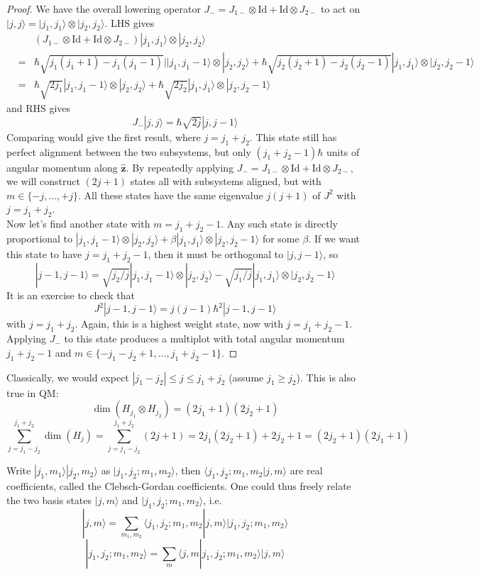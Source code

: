 \documentclass[a4paper]{article}
\begin{document}
\begin{proof}
We have the overall lowering operator $J_-=J_{1-}\otimes\text{Id}+\text{Id}\otimes J_{2-}$ to act on $|j,j\rangle=|j_1,j_1\rangle\otimes|j_2,j_2\rangle$. LHS gives
\begin{eqnarray}
& &(J_{1-}\otimes\text{Id}+\text{Id}\otimes J_{2-})|j_1,j_1\rangle\otimes|j_2,j_2\rangle\nonumber\\&=&\hbar\sqrt{j_1(j_1+1)-j_1(j_1-1)}||j_1,j_1-1\rangle\otimes|j_2,j_2\rangle+\hbar\sqrt{j_2(j_2+1)-j_2(j_2-1)}|j_1,j_1\rangle\otimes|j_2,j_2-1\rangle\nonumber\\&=&\hbar\sqrt{2j_1}|j_1,j_1-1\rangle\otimes|j_2,j_2\rangle+\hbar\sqrt{2j_2}|j_1,j_1\rangle\otimes|j_2,j_2-1\rangle\nonumber
\end{eqnarray}
and RHS gives
$$J_-|j,j\rangle=\hbar\sqrt{2j}|j,j-1\rangle$$
Comparing would give the first result, where $j=j_1+j_2$. This state still has perfect alignment between the two subsystems, but only $(j_1+j_2-1)\hbar$ units of angular momentum along $\mathbf{\hat{z}}$. By repeatedly applying $J_-=J_{1-}\otimes\text{Id}+\text{Id}\otimes J_{2-}$, we will construct $(2j+1)$ states all with subsystems aligned, but with $m\in\{-j,...,+j\}$. All these states have the same eigenvalue $j(j+1)$ of $J^2$ with $j=j_1+j_2$.\\[5pt]
Now let's find another state with $m=j_1+j_2-1$. Any such state is directly proportional to $|j_1,j_1-1\rangle\otimes|j_2,j_2\rangle+\beta|j_1,j_1\rangle\otimes|j_2,j_2-1\rangle$ for some $\beta$. If we want this state to have $j=j_1+j_2-1$, then it must be orthogonal to $|j,j-1\rangle$, so
$$|j-1,j-1\rangle=\sqrt{j_2/j}|j_1,j_1-1\rangle\otimes|j_2,j_2\rangle-\sqrt{j_1/j}|j_1,j_1\rangle\otimes|j_2,j_2-1\rangle$$
It is an exercise to check that
$$J^2|j-1,j-1\rangle=j(j-1)\hbar^2|j-1,j-1\rangle$$
with $j=j_1+j_2$. Again, this is a highest weight state, now with $j = j_1 + j_2 − 1$. Applying $J_-$ to this state produces a multiplot with total angular momentum $j_1+j_2-1$ and $m\in\{-j_1-j_2+1,...,j_1+j_2-1\}$.
\end{proof}
\begin{remarks}
Classically, we would expect $|j_1-j_2|\leq j\leq j_1+j_2$ (assume $j_1\geq j_2$). This is also true in QM: 
$$\dim(H_{j_1}\otimes H_{j_2})=(2j_1+1)(2j_2+1)$$
$$\sum_{j=j_1-j_2}^{j_1+j_2}\dim(H_j)=\sum_{j=j_1-j_2}^{j_1+j_2}(2j+1)=2j_1(2j_2+1)+2j_2+1=(2j_2+1)(2j_1+1)$$
\end{remarks}
\begin{defi}
Write $|j_1,m_1\rangle|j_2,m_2\rangle$ as $|j_1,j_2;m_1,m_2\rangle$, then $\langle j_1,j_2;m_1,m_2|j,m\rangle$ are real coefficients, called the Clebsch-Gordan coefficients. One could thus freely relate the two basis states $|j,m\rangle$ and $|j_1,j_2;m_1,m_2\rangle$, i.e.
$$|j,m\rangle=\sum_{m_1,m_2}\langle j_1,j_2;m_1,m_2|j,m\rangle|j_1,j_2;m_1,m_2\rangle$$
$$|j_1,j_2;m_1,m_2\rangle=\sum_m\langle j,m|j_1,j_2;m_1,m_2\rangle|j,m\rangle$$
\end{defi}
\end{document}

